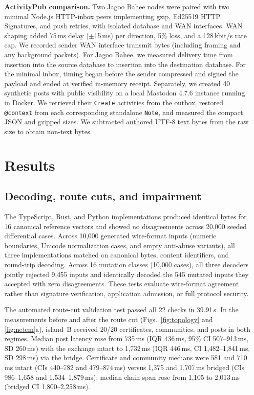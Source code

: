 \documentclass[conference,a4paper,10pt]{IEEEtran}
\begin{document}
\textbf{ActivityPub comparison.} Two Jagoo Bahee nodes were paired with two minimal Node.js HTTP-inbox peers implementing gzip, Ed25519 HTTP Signatures, and push retries, with isolated database and WAN interfaces. WAN shaping added 75\,ms delay ($\pm$15\,ms) per direction, 5\% loss, and a 128\,kbit/s rate cap. We recorded sender WAN interface transmit bytes (including framing and any background packets). For Jagoo Bahee, we measured delivery time from insertion into the source database to insertion into the destination database. For the minimal inbox, timing began before the sender compressed and signed the payload and ended at verified in-memory receipt. Separately, we created 40 synthetic posts with public visibility on a local Mastodon 4.7.6 instance running in Docker. We retrieved their \texttt{Create} activities from the outbox, restored \texttt{@context} from each corresponding standalone \texttt{Note}, and measured the compact JSON and gzipped sizes. We subtracted authored UTF-8 text bytes from the raw size to obtain non-text bytes.

\section{Results}
\label{sec:results}

\subsection{Decoding, route cuts, and impairment}

The TypeScript, Rust, and Python implementations produced identical bytes for 16 canonical reference vectors and showed no disagreements across 20,000 seeded differential cases. Across 10,000 generated wire-format inputs (numeric boundaries, Unicode normalization cases, and empty anti-abuse variants), all three implementations matched on canonical bytes, content identifiers, and round-trip decoding. Across 16 mutation classes (10,000 cases), all three decoders jointly rejected 9,455 inputs and identically decoded the 545 mutated inputs they accepted with zero disagreements. These tests evaluate wire-format agreement rather than signature verification, application admission, or full protocol security.

The automated route-cut validation test passed all 22 checks in 39.91\,s. In the measurements before and after the route cut (Figs.~\ref{fig:topology} and \ref{fig:netem}a), island~B received 20/20 certificates, communities, and posts in both regimes. Median post latency rose from 735\,ms (IQR 436\,ms, 95\% CI 507--913\,ms, SD 260\,ms) with the exchange intact to 1,732\,ms (IQR 446\,ms, CI 1,482--1,841\,ms, SD 298\,ms) via the bridge. Certificate and community medians were 581 and 710\,ms intact (CIs 440--782 and 479--874\,ms) versus 1,375 and 1,707\,ms bridged (CIs 986--1,658 and 1,534--1,879\,ms); median chain span rose from 1,105 to 2,013\,ms (bridged CI 1,800--2,258\,ms).
\end{document}
